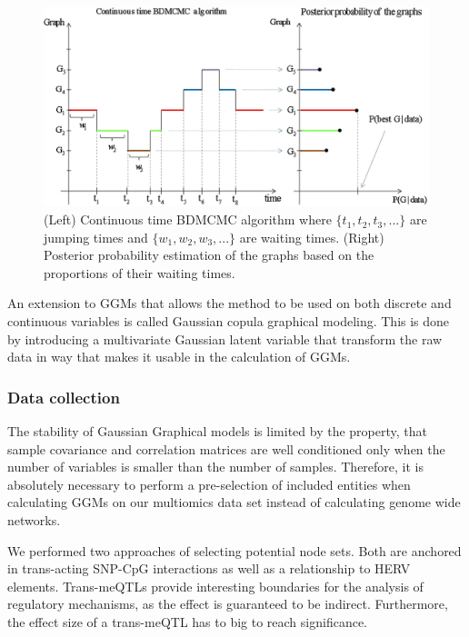 \documentclass[a4paper,12pt,twoside,openright]{article}
\begin{document}
\begin{figure}[b!]
\begin{center}
	\includegraphics[scale=0.33, keepaspectratio = true]{../figures/bdgraph_waiting_graph}
	\end{center}
	\caption{(Left) Continuous time BDMCMC algorithm where $\{t_1 , t_2 , t_3 , ...\}$ are jumping times and $\{w_1 , w_2 , w_3 , ...\}$ are waiting times. (Right) Posterior probability estimation of the graphs based on the proportions of their waiting times.}
	\label{fig:bdgraph.waiting.graph}
\end{figure}

An extension to GGMs that allows the method to be used on both discrete and continuous variables is called Gaussian copula graphical modeling. This is done by introducing a multivariate Gaussian latent variable that transform the raw data in way that makes it usable in the calculation of GGMs. 

\subsubsection{Data collection}
\label{Methods:Data collection}
The stability of Gaussian Graphical models is limited by the property, that sample covariance and correlation matrices are well conditioned only when the number of variables is smaller than the number of samples\cite{Schaefer2005}. Therefore, it is absolutely necessary to perform a pre-selection of included entities when calculating GGMs on our multiomics data set instead of calculating genome wide networks.

We performed two approaches of selecting potential node sets. Both are anchored in trans-acting SNP-CpG interactions as well as a relationship to HERV elements. Trans-meQTLs provide interesting boundaries for the analysis of regulatory mechanisms, as the effect is guaranteed to be indirect. Furthermore, the effect size of a trans-meQTL has to big to reach significance. 
\end{document}
